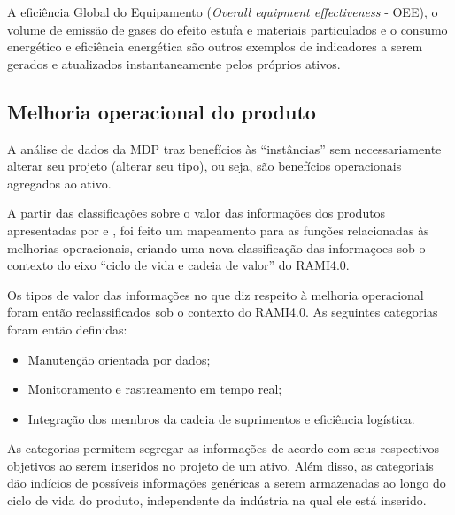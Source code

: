 A eficiência Global do Equipamento (\textit{Overall equipment effectiveness} - OEE), o volume de emissão de gases do efeito estufa e materiais particulados e o consumo energético e eficiência energética são outros exemplos de indicadores a serem gerados e atualizados instantaneamente pelos próprios ativos.

\subsection{Melhoria operacional do produto}
\label{sec:melhoria-operacional}



A análise de dados da MDP traz benefícios às ``instâncias'' sem necessariamente alterar seu projeto (alterar seu tipo), ou seja, são benefícios operacionais agregados ao ativo.

A partir das classificações sobre o valor das informações dos produtos apresentadas por  e , foi feito um mapeamento para as funções relacionadas às melhorias operacionais, criando uma nova classificação das informaçoes sob o contexto do eixo ``ciclo de vida e cadeia de valor'' do RAMI4.0.

Os tipos de valor das informações no que diz respeito à melhoria operacional foram então reclassificados sob o contexto do RAMI4.0. As seguintes categorias foram então definidas:

\begin{itemize}
	\item Manutenção orientada por dados;
	\item Monitoramento e rastreamento em tempo real;
	\item Integração dos membros da cadeia de suprimentos e eficiência logística.
\end{itemize}

As categorias permitem segregar as informações de acordo com seus respectivos objetivos ao serem inseridos no projeto de um ativo. Além disso, as categoriais dão indícios de possíveis informações genéricas a serem armazenadas ao longo do ciclo de vida do produto, independente da indústria na qual ele está inserido.

